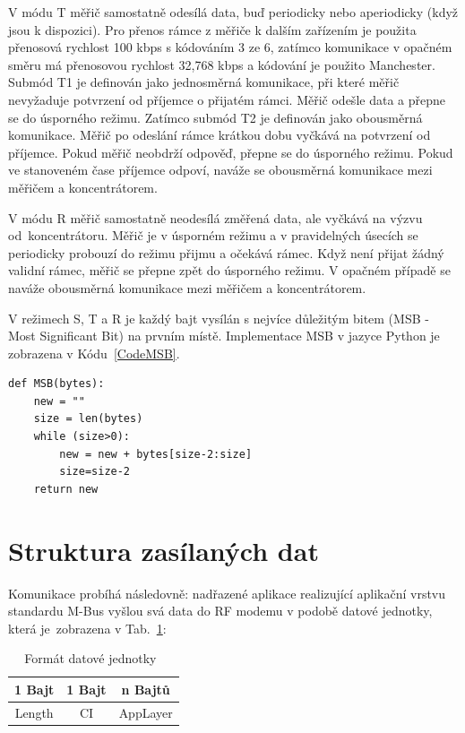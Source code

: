 V	módu T měřič samostatně odesílá data, buď periodicky nebo aperiodicky (když jsou k dispozici). Pro přenos rámce z měřiče k dalším zařízením je použita přenosová rychlost 100 kbps s kódováním 3 ze 6, zatímco komunikace v opačném směru má přenosovou rychlost 32,768 kbps a kódování je použito Manchester. Submód T1 je definován jako jednosměrná komunikace, při které měřič nevyžaduje potvrzení od příjemce o přijatém rámci. Měřič odešle data a přepne se do úsporného režimu. Zatímco submód T2 je definován jako obousměrná komunikace. Měřič po odeslání rámce krátkou dobu vyčkává na potvrzení od příjemce. Pokud měřič neobdrží odpověď, přepne se do úsporného režimu. Pokud ve stanoveném čase příjemce odpoví, naváže se obousměrná komunikace mezi měřičem a koncentrátorem.

V	módu R měřič samostatně neodesílá změřená data, ale vyčkává na výzvu od~koncentrátoru. Měřič je v úsporném režimu a v pravidelných úsecích se periodicky probouzí do režimu přijmu a očekává rámec. Když není přijat žádný validní rámec, měřič se přepne zpět do úsporného režimu. V	opačném případě se naváže obousměrná komunikace mezi měřičem a koncentrátorem.

V režimech S, T a R je každý bajt vysílán s nejvíce důležitým bitem (MSB - Most
Significant Bit) na prvním místě. Implementace MSB v jazyce Python je zobrazena v Kódu~\ref{CodeMSB}.

\begin{lstlisting}[caption={Implementace vyčítaní uložení MSB},captionpos=b,label=CodeMSB,style=MyCodePython]
def MSB(bytes):
    new = ""
    size = len(bytes)
    while (size>0):
        new = new + bytes[size-2:size]
        size=size-2
    return new
\end{lstlisting}


\section{Struktura zasílaných dat}
Komunikace probíhá následovně: nadřazené aplikace realizující aplikační vrstvu standardu M-Bus vyšlou svá data do RF modemu v podobě datové jednotky, která je~zobrazena v Tab.~\ref{PaketWm1}:


\begin{table}[!ht]
\vspace{-10pt}
\centering
\begin{tabular}{ccc}
1 Bajt & 1 Bajt & n Bajtů \\ \hline
\multicolumn{1}{|c|}{Length} & \multicolumn{1}{c|}{CI} & \multicolumn{1}{c|}{AppLayer} \\ \hline
\end{tabular}
\caption{Formát datové jednotky~\cite{FormatDatoveJednotky}}
\label{PaketWm1}
\vspace{-10pt}
\end{table}

